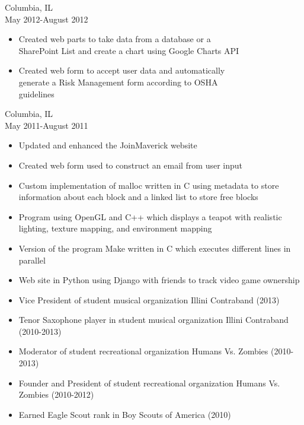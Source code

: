 \documentclass[11pt]{article}
\begin{document}
     \hfill Columbia, IL\\
     \hfill May 2012-August 2012
    \begin{itemize}[noitemsep,topsep=0pt,leftmargin=52pt]
      \item Created web parts to take data from a database or a\\
        SharePoint List and create a chart using Google Charts API
      \item Created web form to accept user data and automatically\\
        generate a Risk Management form according to OSHA\\
        guidelines
    \end{itemize}
    \medskip

     \hfill Columbia, IL\\
     \hfill May 2011-August 2011
    \begin{itemize}[noitemsep,topsep=0pt,leftmargin=52pt]
      \item Updated and enhanced the JoinMaverick website
      \item Created web form used to construct an email from user input
    \end{itemize}

  \bigskip

  \begin{itemize}[noitemsep,topsep=0pt]
      \item Custom implementation of malloc written in C using metadata to store information about each block and a linked list to store free blocks
      \item Program using OpenGL and C++ which displays a teapot with realistic lighting, texture mapping, and environment mapping
      \item Version of the program Make written in C which executes different lines in parallel
      \item Web site in Python using Django with friends to track video game ownership
  \end{itemize}

  \bigskip

  \begin{itemize}[noitemsep,topsep=0pt]
    \item Vice President of student musical organization Illini Contraband \hfill (2013)
    \item Tenor Saxophone player in student musical organization Illini Contraband \hfill (2010-2013)
    \item Moderator of student recreational organization Humans Vs. Zombies \hfill (2010-2013)
    \item Founder and President of student recreational organization Humans Vs. Zombies \hfill (2010-2012)
    \item Earned Eagle Scout rank in Boy Scouts of America \hfill (2010)
  \end{itemize}
\end{document}
